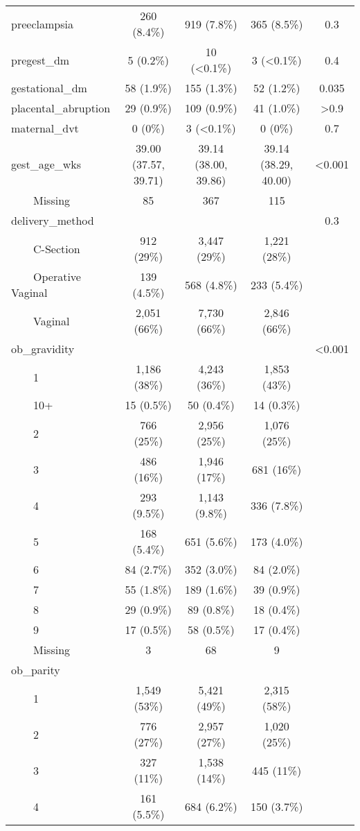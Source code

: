 \begin{longtable}{lcccc}
preeclampsia & 260 (8.4\%) & 919 (7.8\%) & 365 (8.5\%) & 0.3 \\ 
pregest\_dm & 5 (0.2\%) & 10 (<0.1\%) & 3 (<0.1\%) & 0.4 \\ 
gestational\_dm & 58 (1.9\%) & 155 (1.3\%) & 52 (1.2\%) & 0.035 \\ 
placental\_abruption & 29 (0.9\%) & 109 (0.9\%) & 41 (1.0\%) & >0.9 \\ 
maternal\_dvt & 0 (0\%) & 3 (<0.1\%) & 0 (0\%) & 0.7 \\ 
gest\_age\_wks & 39.00 (37.57, 39.71) & 39.14 (38.00, 39.86) & 39.14 (38.29, 40.00) & <0.001 \\ 
    Missing & 85 & 367 & 115 &  \\ 
delivery\_method &  &  &  & 0.3 \\ 
    C-Section & 912 (29\%) & 3,447 (29\%) & 1,221 (28\%) &  \\ 
    Operative Vaginal & 139 (4.5\%) & 568 (4.8\%) & 233 (5.4\%) &  \\ 
    Vaginal & 2,051 (66\%) & 7,730 (66\%) & 2,846 (66\%) &  \\ 
ob\_gravidity &  &  &  & <0.001 \\ 
    1 & 1,186 (38\%) & 4,243 (36\%) & 1,853 (43\%) &  \\ 
    10+ & 15 (0.5\%) & 50 (0.4\%) & 14 (0.3\%) &  \\ 
    2 & 766 (25\%) & 2,956 (25\%) & 1,076 (25\%) &  \\ 
    3 & 486 (16\%) & 1,946 (17\%) & 681 (16\%) &  \\ 
    4 & 293 (9.5\%) & 1,143 (9.8\%) & 336 (7.8\%) &  \\ 
    5 & 168 (5.4\%) & 651 (5.6\%) & 173 (4.0\%) &  \\ 
    6 & 84 (2.7\%) & 352 (3.0\%) & 84 (2.0\%) &  \\ 
    7 & 55 (1.8\%) & 189 (1.6\%) & 39 (0.9\%) &  \\ 
    8 & 29 (0.9\%) & 89 (0.8\%) & 18 (0.4\%) &  \\ 
    9 & 17 (0.5\%) & 58 (0.5\%) & 17 (0.4\%) &  \\ 
    Missing & 3 & 68 & 9 &  \\ 
ob\_parity &  &  &  &  \\ 
    1 & 1,549 (53\%) & 5,421 (49\%) & 2,315 (58\%) &  \\ 
    2 & 776 (27\%) & 2,957 (27\%) & 1,020 (25\%) &  \\ 
    3 & 327 (11\%) & 1,538 (14\%) & 445 (11\%) &  \\ 
    4 & 161 (5.5\%) & 684 (6.2\%) & 150 (3.7\%) &  \\ 

\end{longtable}
